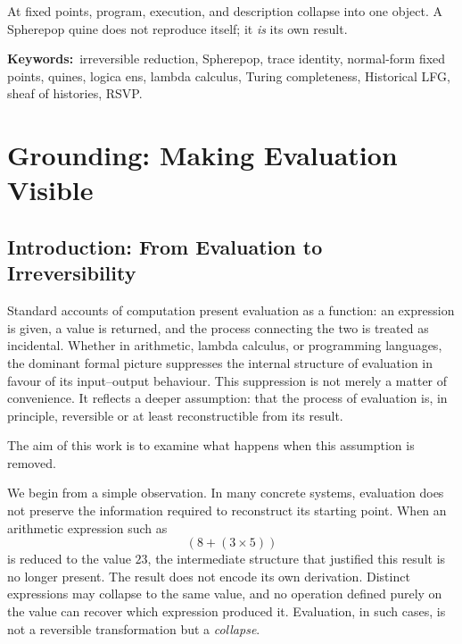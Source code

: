 \documentclass[12pt, oneside]{amsbook}
\theoremstyle{plain}
\theoremstyle{definition}
\theoremstyle{remark}
\begin{document}
At fixed points, program, execution, and description collapse into one object.
A Spherepop quine does not reproduce itself; it \emph{is} its own result.

\medskip\noindent
\textbf{Keywords:}\ irreversible reduction, Spherepop, trace identity,
normal-form fixed points, quines, logica ens, lambda calculus,
Turing completeness, Historical LFG, sheaf of histories, RSVP.

\tableofcontents

\part{Grounding: Making Evaluation Visible}

\chapter{Introduction: From Evaluation to Irreversibility}
\label{ch:intro}

Standard accounts of computation present evaluation as a function: an
expression is given, a value is returned, and the process connecting the two
is treated as incidental. Whether in arithmetic, lambda calculus, or programming
languages, the dominant formal picture suppresses the internal structure of
evaluation in favour of its input--output behaviour. This suppression is not
merely a matter of convenience. It reflects a deeper assumption: that the
process of evaluation is, in principle, reversible or at least reconstructible
from its result.

The aim of this work is to examine what happens when this assumption is removed.

We begin from a simple observation. In many concrete systems, evaluation does
not preserve the information required to reconstruct its starting point. When
an arithmetic expression such as
\[
  (8 + (3 \times 5))
\]
is reduced to the value $23$, the intermediate structure that justified this
result is no longer present. The result does not encode its own derivation.
Distinct expressions may collapse to the same value, and no operation defined
purely on the value can recover which expression produced it. Evaluation, in
such cases, is not a reversible transformation but a \emph{collapse}.
\end{document}
